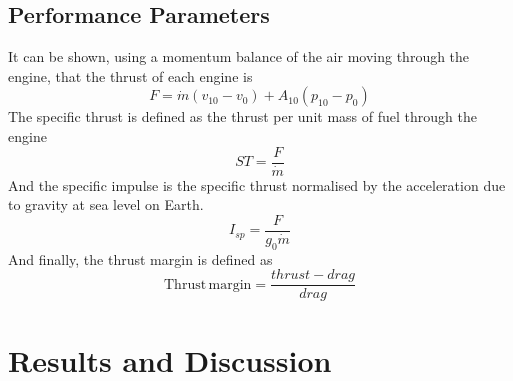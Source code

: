 \documentclass[a4paper]{article}
\begin{document}
\subsection{Performance Parameters}
It can be shown, using a momentum balance of the air moving through the engine, that the thrust of each engine is
\begin{equation}\label{eqn:thrust}
    F = \dot{m}\left( v_{10} - v_0 \right) + A_{10}\left( p_{10} -  p_0 \right)
\end{equation}
The specific thrust is defined as the thrust per unit mass of fuel through the engine
\begin{equation}
    ST = \frac{F}{\dot{m}}
\end{equation}
And the specific impulse is the specific thrust normalised by the acceleration due to gravity at sea level on Earth.
\begin{equation}
    I_{sp} = \frac{F}{g_0 \dot{m}}
\end{equation}
And finally, the thrust margin is defined as
\begin{equation}
    \mathrm{Thrust \, margin} = \frac{thrust - drag}{drag}
\end{equation}

\newpage
\section{Results and Discussion}
\end{document}
